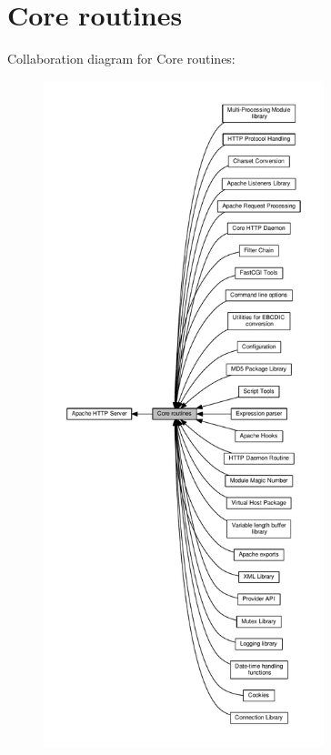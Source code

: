 \hypertarget{group__APACHE__CORE}{}\section{Core routines}
\label{group__APACHE__CORE}
Collaboration diagram for Core routines\+:
\nopagebreak
\begin{figure}[H]
\begin{center}
\leavevmode
\includegraphics[height=550pt]{group__APACHE__CORE}
\end{center}
\end{figure}
